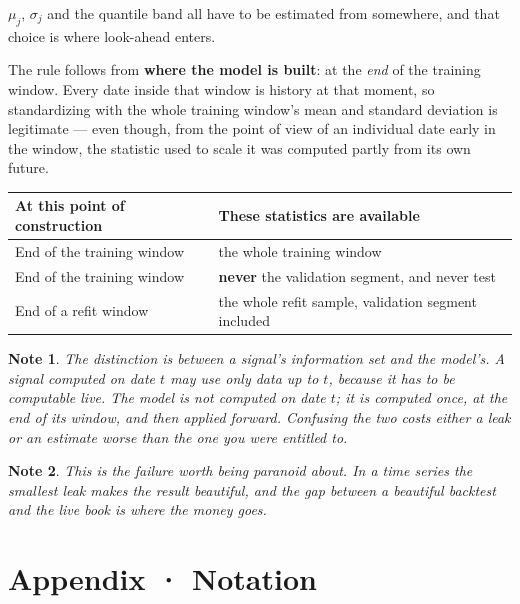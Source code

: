 \documentclass[11pt]{article}
\theoremstyle{runin}
\newtheorem*{note}{Note}
\begin{document}
$\mu_j$, $\sigma_j$ and the quantile band all have to be estimated from somewhere, and that choice
is where look-ahead enters.

The rule follows from \textbf{where the model is built}: at the \emph{end} of the training window.
Every date inside that window is history at that moment, so standardizing with the whole training
window's mean and standard deviation is legitimate --- even though, from the point of view of an
individual date early in the window, the statistic used to scale it was computed partly from its
own future.

\begin{center}
\begin{tabularx}{\linewidth}{@{}L{6cm}X@{}}
\toprule
\textbf{At this point of construction} & \textbf{These statistics are available} \\
\midrule
End of the training window & the whole training window \\
End of the training window & \textbf{never} the validation segment, and never test \\
End of a refit window      & the whole refit sample, validation segment included \\
\bottomrule
\end{tabularx}
\end{center}

\begin{note}
The distinction is between \emph{a signal's} information set and \emph{the model's}. A signal
computed on date $t$ may use only data up to $t$, because it has to be computable live. The model
is not computed on date $t$; it is computed once, at the end of its window, and then applied
forward. Confusing the two costs either a leak or an estimate worse than the one you were entitled
to.
\end{note}

\begin{note}
This is the failure worth being paranoid about. In a time series the smallest leak makes the
result beautiful, and the gap between a beautiful backtest and the live book is where the money
goes.
\end{note}

\section*{Appendix · Notation}
\end{document}
